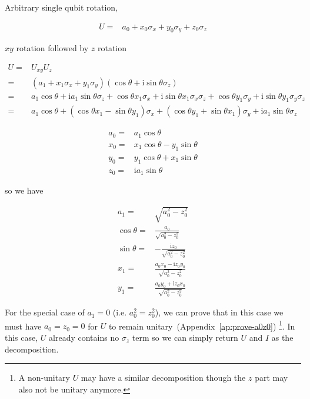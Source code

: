 \documentclass[10pt,fleqn]{article}
\newcommand{\ui}{\mathrm{i}}
\newcommand{\eqar}[1]
{
  \begin{align*}
    #1
  \end{align*}
}
\newcommand{\paren}[1]{{\left({#1}\right)}}
\begin{document}
Arbitrary single qubit rotation,
\eqar{
  U=&a_0 + x_0 \sigma_x + y_0 \sigma_y + z_0 \sigma_z
}
$xy$ rotation followed by $z$ rotation
\eqar{
  U=&U_{xy} U_z\\
  =&\paren{a_1 + x_1 \sigma_x + y_1 \sigma_y}\paren{\cos\theta + \ui\sin\theta\sigma_z}\\
  =&a_1\cos\theta + \ui a_1\sin\theta \sigma_z + \cos\theta x_1 \sigma_x + \ui\sin\theta x_1 \sigma_x\sigma_z + \cos\theta y_1 \sigma_y + \ui\sin\theta y_1 \sigma_y\sigma_z\\
  =&a_1\cos\theta + \paren{\cos\theta x_1 - \sin\theta y_1} \sigma_x + \paren{\cos\theta y_1 + \sin\theta x_1} \sigma_y + \ui a_1\sin\theta \sigma_z
}
\eqar{
  a_0=&a_1\cos\theta\\
  x_0=&x_1\cos\theta - y_1\sin\theta\\
  y_0=&y_1\cos\theta + x_1\sin\theta\\
  z_0=&\ui a_1\sin\theta
}
so we have
\eqar{
  a_1=&\sqrt{a_0^2-z_0^2}\\
  \cos\theta=&\frac{a_0}{\sqrt{a_0^2-z_0^2}}\\
  \sin\theta=&-\frac{\ui z_0}{\sqrt{a_0^2-z_0^2}}\\
  x_1=&\frac{a_0x_0-\ui z_0y_0}{\sqrt{a_0^2-z_0^2}}\\
  y_1=&\frac{a_0y_0+\ui z_0x_0}{\sqrt{a_0^2-z_0^2}}
}

For the special case of $a_1=0$ (i.e. $a_0^2=z_0^2$),
we can prove that in this case we must have $a_0=z_0=0$ for $U$ to remain
unitary~(Appendix~\ref{ap:prove-a0z0})
\footnote{A non-unitary $U$ may have a similar decomposition
  though the $z$ part may also not be unitary anymore.}.
In this case, $U$ already contains no $\sigma_z$ term so we can simply
return $U$ and $I$ as the decomposition.
\end{document}
